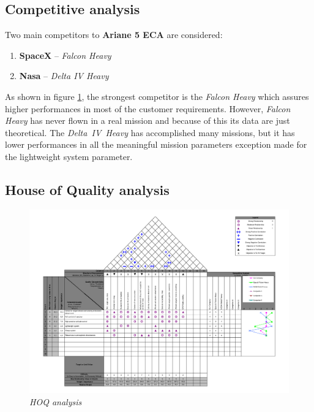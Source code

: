\documentclass[12pt,fleqn,openany]{book} %
\begin{document}
\subsection{Competitive analysis}
Two main competitors to \textbf{Ariane 5 ECA} are considered:
\begin{enumerate}
 \item \textbf{SpaceX} – \textit{Falcon Heavy}
 \item \textbf{Nasa} – \textit{Delta IV Heavy}
\end{enumerate}
As shown in figure \hypertarget{fig:hoq}{\ref{fig:hoq}}, the strongest competitor is the \textit{Falcon Heavy} which assures higher performances in most of the customer requirements. However, \textit{Falcon Heavy} has never flown in a real mission and because of this its data are just theoretical. The \textit{Delta~IV~Heavy} has accomplished many missions, but it has lower performances in all the meaningful mission parameters exception made for the lightweight system parameter.
\newpage
\subsection{House of Quality analysis}
\begin{figure}[h]
 \centering
 \includegraphics[width=1.2\textwidth,angle=270]{HOQ}
 \caption{\emph{HOQ analysis}}
 \label{fig:hoq}
\end{figure}
\end{document}
